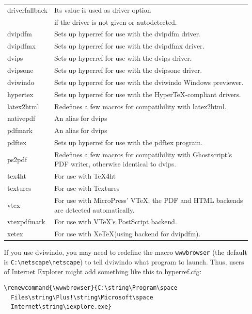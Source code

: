 \documentclass[pdftex]{article}
\newcommand{\bs}{\symbol{'134}}%
\newcommand{\ci}[1]{\texttt{\bs#1}}
\begin{document}
\noindent\begin{longtable}{>{\ttfamily}lp{.8\hsize}}
driverfallback & Its value is used as driver option\\
            & if the driver is not given or autodetected.\\
dvipdfm     & Sets up \textsf{hyperref} for use with the \textsf{dvipdfm} driver.\\
dvipdfmx    & Sets up \textsf{hyperref} for use with the \textsf{dvipdfmx} driver.\\
dvips       & Sets up \textsf{hyperref} for use with the \textsf{dvips} driver. \\
dvipsone    & Sets up \textsf{hyperref} for use with the \textsf{dvipsone} driver. \\
dviwindo    & Sets up \textsf{hyperref} for use with the \textsf{dviwindo} Windows previewer. \\
hypertex    & Sets up \textsf{hyperref} for use with the Hyper\TeX-compliant drivers. \\
latex2html  & Redefines a few macros for compatibility with \textsf{latex2html}. \\
nativepdf   & An alias for \textsf{dvips} \\
pdfmark     & An alias for \textsf{dvips} \\
pdftex      & Sets up \textsf{hyperref} for use with the \textsf{pdftex} program.\\
ps2pdf      & Redefines a few macros for compatibility with
              Ghostscript's PDF writer, otherwise identical to
              \textsf{dvips}. \\
tex4ht      & For use with \textsf{\TeX4ht} \\
textures    & For use with \textsf{Textures} \\
vtex        & For use with MicroPress' \textsf{VTeX}; the PDF
                       and HTML backends are detected automatically. \\
vtexpdfmark & For use with \textsf{VTeX}'s PostScript backend. \\
xetex       & For use with Xe\TeX (using backend for dvipdfm).
\end{longtable}
\smallskip

If you use \textsf{dviwindo}, you may need to redefine the macro
\ci{wwwbrowser} (the default is \verb|C:\netscape\netscape|) to tell
\textsf{dviwindo} what program to launch. Thus, users of Internet
Explorer might add something like this to hyperref.cfg:

\begin{verbatim}
\renewcommand{\wwwbrowser}{C:\string\Program\space
  Files\string\Plus!\string\Microsoft\space
  Internet\string\iexplore.exe}
\end{verbatim}
\end{document}
